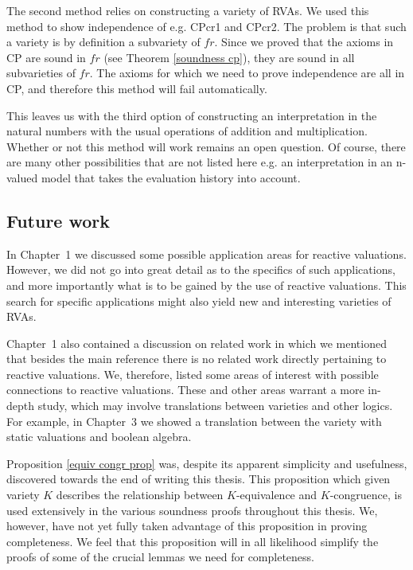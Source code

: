 \documentclass[a4paper,twoside,openright]{report}
\begin{document}
The second method relies on constructing a variety of RVAs. We used this method to show independence of e.g. CPcr1 and CPcr2. The problem is that such a variety is by definition a subvariety of $fr$. Since we proved that the axioms in CP are sound in $fr$ (see Theorem \ref{soundness cp}), they are sound in all subvarieties of $fr$. The axioms for which we need to prove independence are all in CP, and therefore this method will fail automatically.

This leaves us with the third option of constructing an interpretation in the natural numbers with the usual operations of addition and multiplication. Whether or not this method will work remains an open question. Of course, there are many other possibilities that are not listed here e.g. an interpretation in an n-valued model that takes the evaluation history into account.

\subsection{Future work}
In Chapter~1 we discussed some possible application areas for reactive valuations. However, we did not go into great detail as to the specifics of such applications, and more importantly what is to be gained by the use of reactive valuations. This search for specific applications might also yield new and interesting varieties of RVAs. 

Chapter~1 also contained a discussion on related work in which we mentioned that besides the main reference \cite{main} there is no related work directly pertaining to reactive valuations. We, therefore, listed some areas of interest with possible connections to reactive valuations. These and other areas warrant a more in-depth study, which may involve translations between varieties and other logics. For example, in Chapter~3 we showed a translation between the variety with static valuations and boolean algebra.

Proposition \ref{equiv congr prop} was, despite its apparent simplicity and usefulness, discovered towards the end of writing this thesis. This proposition which given variety $K$ describes the relationship between $K$-equivalence and $K$-congruence, is used extensively in the various soundness proofs throughout this thesis. We, however, have not yet fully taken advantage of this proposition in proving completeness. We feel that this proposition will in all likelihood simplify the proofs of some of the crucial lemmas we need for completeness.
\end{document}
